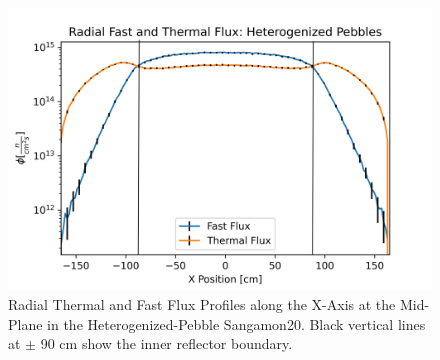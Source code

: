 \begin{figure}[H]
\centering

\includegraphics[width=0.95\linewidth]{figures/fast_therm_flux_hetv2.png}

\caption{Radial Thermal and Fast Flux Profiles along the X-Axis at the Mid-Plane in the Heterogenized-Pebble Sangamon20.  Black vertical lines at $\pm$ 90 cm show the inner reflector boundary.}
\label{fig:het-det-xy}
\end{figure}